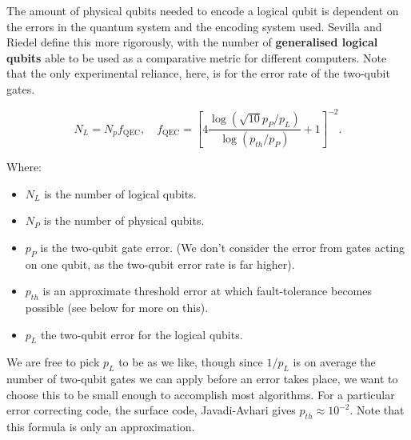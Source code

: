 \documentclass{article}
\theoremstyle{definition}
\begin{document}
The amount of physical qubits needed to encode a logical qubit is dependent on the errors in the quantum system and the encoding system used. Sevilla and Riedel \cite{sevilla2020forecasting} define this more rigorously, with the number of \textbf{generalised logical qubits} able to be used as a comparative metric for different computers. Note that the only experimental reliance, here, is for the error rate of the two-qubit gates. 

\[
N_L = N_p f_{\text{QEC}}, \quad f_{\text{QEC}} = \left[ 4 \frac{\log (\sqrt{10} p_P/p_L)}{\log(p_{th}/p_P)} + 1 \right]^{-2}.
\]

Where:
\begin{itemize}
    \item $N_L$ is the number of logical qubits.
    \item $N_P$ is the number of physical qubits.
    \item $p_P$ is the two-qubit gate error. (We don't consider the error from gates acting on one qubit, as the two-qubit error rate is far higher).
    \item $p_{th}$ is an approximate threshold error at which fault-tolerance becomes possible (see below for more on this). 
    \item $p_L$ the two-qubit error for the logical qubits.
\end{itemize}
We are free to pick $p_L$ to be as we like, though since $1/p_L$ is on average the number of two-qubit gates we can apply before an error takes place, we want to choose this to be small enough to accomplish most algorithms. For a particular error correcting code, the surface code, Javadi-Avhari \cite{javadi-avhari_2017} gives $p_{th} \approx 10^{-2}$. Note that this formula is only an approximation. 
\end{document}
